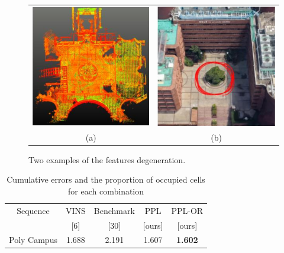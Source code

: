 \documentclass[10pt, letterpaper]{article}
\begin{document}
\begin{multicols*}{2}
\begin{enumerate}
\begin{figure}[H]
    \centering
    \begin{tabular}{cc}{}
        \includegraphics[width=0.48\columnwidth]{images/a3.png}&
        \includegraphics[width=0.48\columnwidth]{images/b3.png}\\
         (a)  & (b) \\
         
    \end{tabular}
    \caption{Two examples of the features degeneration.}
    \label{fig:table_ab3}
\end{figure}

\begin{table}[H] %
    \centering
    \begin{tabular}{ccccc}
    \hline
        Sequence & VINS  & Benchmark & PPL & PPL-OR\\
         & [6] & [30] & [ours] & [ours]\\
    \hline
     Poly Campus & 1.688 & 2.191 & 1.607 & \textbf{1.602} \\
    \hline
    \end{tabular}
    \caption{ Cumulative errors and the proportion of occupied cells for each combination}
    \label{tab:my_table}
\end{table}


\end{enumerate}
\end{multicols*}
\end{document}
